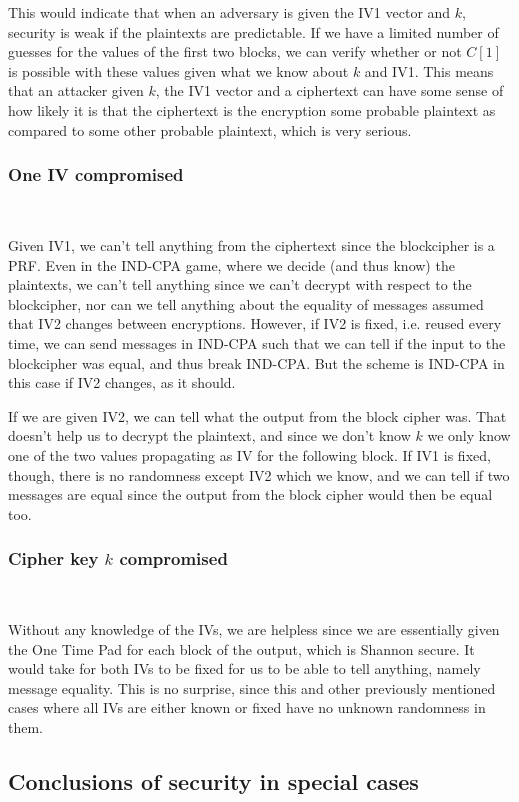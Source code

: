 \documentclass[conference]{IEEEtran}
\begin{document}
This would indicate that when an adversary is given the IV1 vector and $k$, security is weak if the plaintexts are predictable. If we have a limited number of guesses for the values of the first two blocks, we can verify whether or not $C[1]$ is possible with these values given what we know about $k$ and IV1. This means that an attacker given $k$, the IV1 vector and a ciphertext can have some sense of how likely it is that the ciphertext is the encryption some probable plaintext as compared to some other probable plaintext, which is very serious.

\subsubsection{One IV compromised} \

Given IV1, we can't tell anything from the ciphertext since the blockcipher is a PRF. Even in the IND-CPA game, where we decide (and thus know) the plaintexts, we can't tell anything since we can't decrypt with respect to the blockcipher, nor can we tell anything about the equality of messages assumed that IV2 changes between encryptions. However, if IV2 is fixed, i.e. reused every time, we can send messages in IND-CPA such that we can tell if the input to the blockcipher was equal, and thus break IND-CPA. But the scheme is IND-CPA in this case if IV2 changes, as it should. \

If we are given IV2, we can tell what the output from the block cipher was. That doesn't help us to decrypt the plaintext, and since we don't know $k$ we only know one of the two values propagating as IV for the following block. If IV1 is fixed, though, there is no randomness except IV2 which we know, and we can tell if two messages are equal since the output from the block cipher would then be equal too.

\subsubsection{Cipher key $k$ compromised} \

Without any knowledge of the IVs, we are helpless since we are essentially given the One Time Pad for each block of the output, which is Shannon secure. It would take for both IVs to be fixed for us to be able to tell anything, namely message equality. This is no surprise, since this and other previously mentioned cases where all IVs are either known or fixed have no unknown randomness in them.

\subsection{Conclusions of security in special cases}
\end{document}
